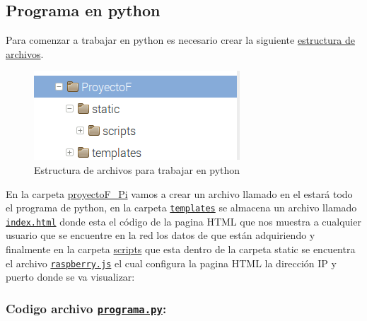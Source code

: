 \documentclass[10pt]{article}\usepackage[]{graphicx}\usepackage[]{color}
\begin{document}
  \subsection{Programa en python }
   
   
Para comenzar a trabajar en python es necesario crear la siguiente \href{https://github.com/wilrilo/repo_final_nube/tree/master/repo_final_nube/ProyectoF_Pi}{estructura de archivos}.

	
		\begin{figure}[ht] 
			\centering
			\includegraphics[scale=1]{estructura}   %
			\caption{Estructura de archivos para trabajar en python}	
		\end{figure}


		
 En la carpeta \href{https://github.com/wilrilo/repo_final_nube/tree/master/repo_final_nube/ProyectoF_Pi}{proyectoF\_Pi} vamos a crear un archivo llamado  en el estará todo el programa de python, en la carpeta \href{https://github.com/wilrilo/repo_final_nube/tree/master/repo_final_nube/ProyectoF_Pi/templates}{\texttt{templates}} se almacena un archivo llamado \href{https://github.com/wilrilo/repo_final_nube/blob/master/repo_final_nube/ProyectoF_Pi/templates/index.html}{\texttt{index.html}} donde esta el código de la pagina HTML que nos muestra a cualquier usuario que se encuentre en la red los datos de que están adquiriendo y finalmente en la carpeta \href{https://github.com/wilrilo/repo_final_nube/tree/master/repo_final_nube/ProyectoF_Pi/static/scripts}{scripts} que esta dentro de la carpeta static se encuentra el archivo \href{https://github.com/wilrilo/repo_final_nube/blob/master/repo_final_nube/ProyectoF_Pi/static/scripts/raspberry.js}{\texttt{raspberry.js}} el cual configura la pagina HTML la dirección IP y puerto donde se va visualizar:
 \\

 \subsubsection{\textbf{Codigo archivo \href{https://github.com/wilrilo/repo_final_nube/blob/master/repo_final_nube/ProyectoF_Pi/programa.py}{\texttt{programa.py}}:}}
\end{document}
